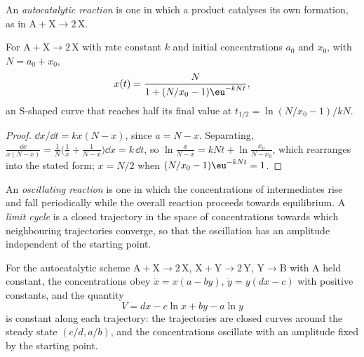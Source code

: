 \begin{definition}\label{def:b3:complex-kinetics:autocatalysis}
An \emph{autocatalytic reaction} is one in which a
product catalyses its own formation, as in $\mathrm{A + X \to 2\,X}$.
\end{definition}

\begin{proposition}\label{prop:b3:complex-kinetics:logistic}
For $\mathrm{A + X \to 2\,X}$ with rate constant $k$ and initial concentrations $a_0$ and $x_0$,
with $N = a_0 + x_0$,
\[
  x(t) = \frac{N}{1 + (N/x_0 - 1)\eu^{-kNt}},
\]
an S-shaped curve that reaches half its final value at $t_{1/2} = \ln(N/x_0 - 1)/kN$.
\end{proposition}

\begin{proof}
$\dd x/\dd t = kx(N - x)$, since $a = N - x$. Separating, $\frac{\dd x}{x(N - x)} = \frac1N\bigl(\frac1x + \frac{1}{N - x}\bigr)\dd x
= k\,\dd t$, so $\ln\frac{x}{N - x} = kNt + \ln\frac{x_0}{N - x_0}$, which rearranges into the stated form;
$x = N/2$ when $(N/x_0 - 1)\eu^{-kNt} = 1$.
\end{proof}

\begin{definition}\label{def:b3:complex-kinetics:oscillating}
An \emph{oscillating reaction} is one in which the
concentrations of intermediates rise and fall periodically while the overall
reaction proceeds towards equilibrium. A \emph{limit cycle} is
a closed trajectory in the space of concentrations towards which neighbouring
trajectories converge, so that the oscillation has an amplitude independent
of the starting point.
\end{definition}

\begin{theorem}\label{thm:b3:complex-kinetics:lotka-volterra}
For the autocatalytic scheme $\mathrm{A + X \to 2\,X}$, $\mathrm{X + Y \to 2\,Y}$, $\mathrm{Y \to B}$ with A held
constant, the concentrations obey $\dot x = x(a - by)$, $\dot y = y(dx - c)$ with positive
constants, and the quantity
\[
  V = dx - c\ln x + by - a\ln y
\]
is constant along each trajectory: the trajectories are closed curves around
the steady state $(c/d, a/b)$, and the concentrations oscillate with an
amplitude fixed by the starting point.
\end{theorem}

